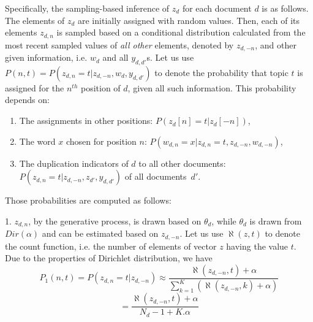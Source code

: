 
Specifically, the sampling-based inference of $z_d$ for each document
$d$ is as follows. The elements of $z_d$ are initially assigned with
random values. Then, each of its elements $z_{d,n}$ is sampled based
on a conditional distribution calculated from the most recent sampled
values of \emph{all other} elements, denoted by $z_{d,-n}$, and other
given information, i.e. $w_d$ and all $y_{d,d'}$s. Let us use $P(n,t)
= P(z_{d,n}=t|z_{d,-n},w_d,y_{d,d'})$ to denote the probability that
topic $t$ is assigned for the $n^{th}$ position of $d$, given
all such information. This probability depends on:

\begin{enumerate}

\item The assignments in other positions: $P(z_d[n]=t|z_d[-n])$,

\item The word $x$ chosen for position $n$: $P(w_{d,n} = x|z_{d,n} = t,z_{d,-n},w_{d,-n})$,

\item The duplication indicators of $d$ to all other documents:
   $P(z_{d,n} = t|z_{d,-n},z_{d'}, y_{d,d'})$ of all documents~$d'$.

\end{enumerate}

\vspace{0.03in}
 Those probabilities are computed as
follows:

1. $z_{d,n}$, by the generative process, is drawn based on $\theta_d$,
   while $\theta_d$ is drawn from $Dir(\alpha)$ and can be estimated
   based on $z_{d,-n}$. Let us use $\aleph(z,t)$ to denote the count
   function, i.e. the number of elements of vector $z$ having the
   value $t$. Due to the properties of Dirichlet distribution, we have
$$P_1(n,t) = P(z_{d,n} = t|z_{d,-n}) \approx \frac {\aleph(z_{d,-n},t) + \alpha} {\sum\nolimits_{k = 1}^K ({\aleph(z_{d,-n},k)} + \alpha)}$$
$$ = \frac {\aleph(z_{d,-n},t) + \alpha} {N_d - 1 + K.\alpha}$$

